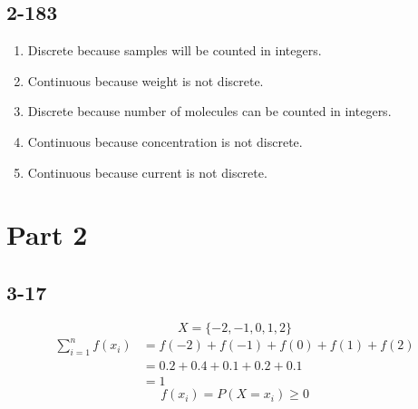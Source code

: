 \documentclass{article}
\begin{document}
\subsection*{2-183}
\begin{enumerate}[label=(\alph*)]
    \item Discrete because samples will be counted in integers.
    \item Continuous because weight is not discrete.
    \item Discrete because number of molecules can be counted in integers.
    \item Continuous because concentration is not discrete.
    \item Continuous because current is not discrete.
\end{enumerate}

\section*{Part 2}
\subsection*{3-17}
\begin{equation*}
    X = \{-2, -1, 0, 1, 2\}
\end{equation*}
\begin{equation*}
    \begin{aligned}
        \sum_{i = 1}^{n} f(x_i) &= f(-2) + f(-1) + f(0) + f(1) + f(2) \\
                                &= 0.2 + 0.4 + 0.1 + 0.2 + 0.1 \\
                                &= 1
    \end{aligned}
\end{equation*}
\begin{equation*}
    f(x_i) = P(X = x_i) \geq 0
\end{equation*}
\end{document}
